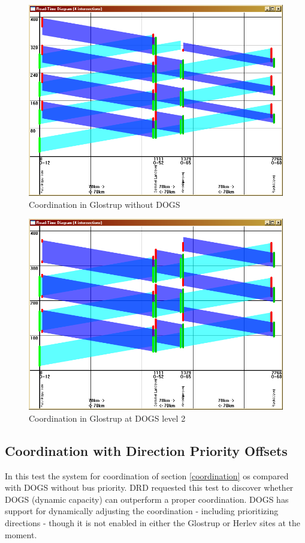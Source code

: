 \begin{figure}[ht]
\begin{center}
\includegraphics[scale=0.30]{coord_p1_glostrup_c80.PNG} 
\end{center}
\caption{Coordination in Glostrup without DOGS}
\label{fig:coord_p1_glostrup_c80}
\end{figure}

\begin{figure}[ht]
\begin{center}
\includegraphics[scale=0.30]{coord_p1_glostrup_c100.PNG} 
\end{center}
\caption{Coordination in Glostrup at DOGS level 2}
\label{fig:coord_p1_glostrup_c100}
\end{figure}

\subsection{Coordination with Direction Priority Offsets}
In this test the system for coordination of section \ref{coordination} os compared with DOGS without bus priority. DRD requested this test to discover whether DOGS (dynamic capacity) can outperform a proper coordination. DOGS has support for dynamically adjusting the coordination - including prioritizing directions - though it is not enabled in either the Glostrup or Herlev sites at the moment.

